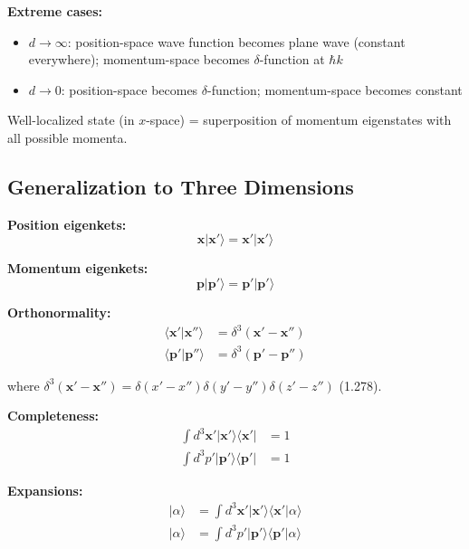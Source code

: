 \documentclass[11pt,a4paper]{article}
\begin{document}
\textbf{Extreme cases:}
\begin{itemize}
\item $d \to \infty$: position-space wave function becomes plane wave (constant everywhere); momentum-space becomes $\delta$-function at $\hbar k$
\item $d \to 0$: position-space becomes $\delta$-function; momentum-space becomes constant
\end{itemize}

Well-localized state (in $x$-space) = superposition of momentum eigenstates with all possible momenta.

\subsection{Generalization to Three Dimensions}

\textbf{Position eigenkets:}
\begin{equation}
\mathbf{x}|\mathbf{x}'\rangle = \mathbf{x}'|\mathbf{x}'\rangle
\tag{1.275}
\end{equation}

\textbf{Momentum eigenkets:}
\begin{equation}
\mathbf{p}|\mathbf{p}'\rangle = \mathbf{p}'|\mathbf{p}'\rangle
\tag{1.276}
\end{equation}

\textbf{Orthonormality:}
\begin{align}
\langle\mathbf{x}'|\mathbf{x}''\rangle &= \delta^3(\mathbf{x}' - \mathbf{x}'') \tag{1.277a} \\
\langle\mathbf{p}'|\mathbf{p}''\rangle &= \delta^3(\mathbf{p}' - \mathbf{p}'') \tag{1.277b}
\end{align}

where $\delta^3(\mathbf{x}' - \mathbf{x}'') = \delta(x' - x'')\delta(y' - y'')\delta(z' - z'')$ (1.278).

\textbf{Completeness:}
\begin{align}
\int d^3\mathbf{x}'|\mathbf{x}'\rangle\langle\mathbf{x}'| &= 1 \tag{1.279a} \\
\int d^3p'|\mathbf{p}'\rangle\langle\mathbf{p}'| &= 1 \tag{1.279b}
\end{align}

\textbf{Expansions:}
\begin{align}
|\alpha\rangle &= \int d^3\mathbf{x}'|\mathbf{x}'\rangle\langle\mathbf{x}'|\alpha\rangle \tag{1.280a} \\
|\alpha\rangle &= \int d^3p'|\mathbf{p}'\rangle\langle\mathbf{p}'|\alpha\rangle \tag{1.280b}
\end{align}
\end{document}
